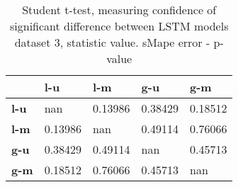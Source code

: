 \begin{table}[H]
\centering
\caption{Student t-test, measuring confidence of significant difference between LSTM models dataset 3, statistic value. sMape error - p-value}
\label{table:ttest-p-values-lstm-experiments-sMAPE-dataset-3}
\begin{tabular}{lllll}
\toprule
{} &      l-u &      l-m &      g-u &      g-m \\
\midrule
\textbf{l-u} &      nan &  0.13986 &  0.38429 &  0.18512 \\
\textbf{l-m} &  0.13986 &      nan &  0.49114 &  0.76066 \\
\textbf{g-u} &  0.38429 &  0.49114 &      nan &  0.45713 \\
\textbf{g-m} &  0.18512 &  0.76066 &  0.45713 &      nan \\
\bottomrule
\end{tabular}
\end{table}
